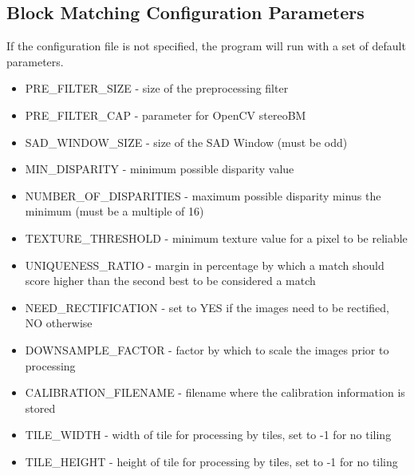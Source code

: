 \subsection{Block Matching Configuration Parameters}
If the configuration file is not specified, the program will run with a set of default parameters.
\begin{itemize}
	\item{\textsc{PRE\_FILTER\_SIZE} - size of the preprocessing filter}
	\item{\textsc{PRE\_FILTER\_CAP} - parameter for OpenCV stereoBM}
	\item{\textsc{SAD\_WINDOW\_SIZE} - size of the SAD Window (must be odd)}
   \item{\textsc{MIN\_DISPARITY} - minimum possible disparity value}
   \item{\textsc{NUMBER\_OF\_DISPARITIES} - maximum possible disparity minus the minimum (must be a multiple of 16)} 
   \item{\textsc{TEXTURE\_THRESHOLD} - minimum texture value for a pixel to be reliable}
   \item{\textsc{UNIQUENESS\_RATIO} - margin in percentage by which a match should score higher than the second best to be considered a match}
   \item{\textsc{NEED\_RECTIFICATION} - set to YES if the images need to be rectified, NO otherwise}
   \item{\textsc{DOWNSAMPLE\_FACTOR} - factor by which to scale the images prior to processing}
   \item{\textsc{CALIBRATION\_FILENAME} - filename where the calibration information is stored}
   \item{\textsc{TILE\_WIDTH} - width of tile for processing by tiles, set to -1 for no tiling}
   \item{\textsc{TILE\_HEIGHT} - height of tile for processing by tiles, set to -1 for no tiling}
\end{itemize}

